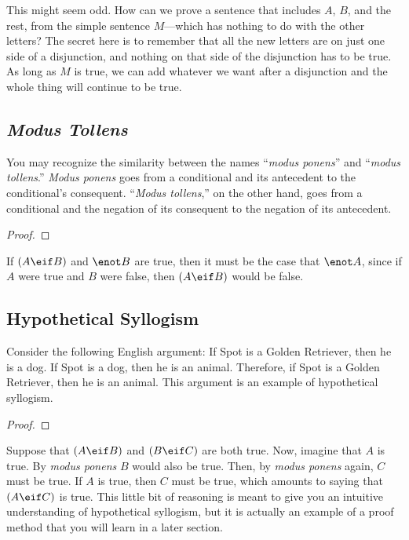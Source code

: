This might seem odd. How can we prove a sentence that includes $A$, $B$, and the rest, from the simple sentence $M$---which has nothing to do with the other letters? The secret here is to remember that all the new letters are on just one side of a disjunction, and nothing on that side of the disjunction has to be true. As long as $M$ is true, we can add whatever we want after a disjunction and the whole thing will continue to be true. 

\subsection{\emph{Modus Tollens}}

You may recognize the similarity between the names ``\emph{modus ponens}'' and ``\emph{modus tollens}.'' \emph{Modus ponens} goes from a conditional and its antecedent to the conditional's consequent. ``\emph{Modus tollens},'' on the other hand, goes from a conditional and the negation of its consequent to the negation of its antecedent. 

\begin{proof}
	 
\end{proof}

If $(A \eif B)$ and $\enot B$ are true, then it must be the case that $\enot A$, since if $A$ were true and $B$ were false, then $(A \eif B)$ would be false.

\subsection{Hypothetical Syllogism}

Consider the following English argument: If Spot is a Golden Retriever, then he is a dog. If Spot is a dog, then he is an animal. Therefore, if Spot is a Golden Retriever, then he is an animal. This argument is an example of hypothetical syllogism. 

\begin{proof}
	 
\end{proof}

Suppose that $(A\eif B)$ and $(B\eif C)$ are both true. Now, imagine that $A$ is true. By \emph{modus ponens} $B$ would also be true. Then, by \emph{modus ponens} again, $C$ must be true. If $A$ is true, then $C$ must be true, which amounts to saying that $(A\eif C)$ is true. This little bit of reasoning is meant to give you an intuitive understanding of hypothetical syllogism, but it is actually an example of a proof method that you will learn in a later section.

